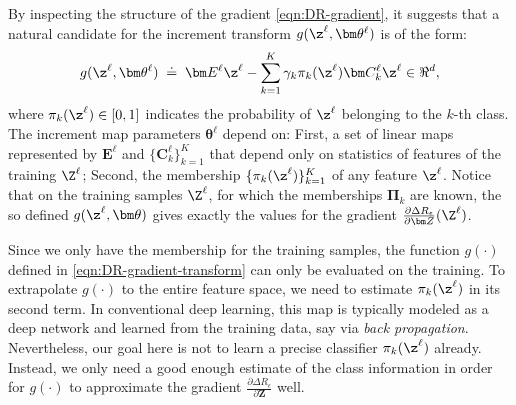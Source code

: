 \documentclass[../../book-main.tex]{subfiles}
\begin{document}
By inspecting the structure of the gradient \eqref{eqn:DR-gradient}, it suggests that a natural candidate for the increment transform $g(\z^\ell, \bm \theta^\ell)$ is of the form:
\begin{equation}
    g(\z^\ell, \bm \theta^\ell) \; \doteq \; \bm E^\ell \z^\ell - \sum_{k=1}^K \gamma_{k} \pi_k(\z^\ell)\bm C_{k}^{\ell}  \z^{\ell}  \in \Re^d,
    \label{eqn:DR-gradient-transform}
\end{equation}
where $\pi_k(\z^\ell) \in [0,1]$ indicates the probability of $\z^{\ell}$ belonging to the $k$-th class. The increment map parameters $\bm \theta^\ell$ depend on: First, a set of linear maps represented by $\bm E^{\ell}$ and $\{ \bm C^{\ell}_{k}\}_{k=1}^{K}$ that depend only on statistics of features of the training $\Z^\ell$; Second, the membership $\{ \pi_k(\z^\ell)\}_{k=1}^K$ of any feature $\z^\ell$. 
Notice that on the training samples $\Z^\ell$, for which the memberships $\bm \Pi_k$ are known,  the so defined $g(\z^\ell, \bm \theta)$ gives exactly the values for the gradient $\frac{\partial \Delta R_{\epsilon}}{\partial \bm Z}(\Z^\ell)$.  


Since we only have the membership  for the training samples, the function $g(\cdot)$ defined in \eqref{eqn:DR-gradient-transform} can only be evaluated on the training. To extrapolate $g(\cdot)$ to the entire feature space, we need to estimate $\pi_k(\z^\ell)$ in its second term. In conventional deep learning, this map is typically modeled as a deep network and learned from the training data, say via {\em back propagation}. Nevertheless, our goal here is not to learn a precise classifier $\pi_{k}(\z^\ell)$ already. Instead, we only need a good enough estimate of the class information in order for $g(\cdot)$ to approximate the gradient $\frac{\partial \Delta R_{\epsilon}}{\partial \bm Z}$ well. 
\end{document}
